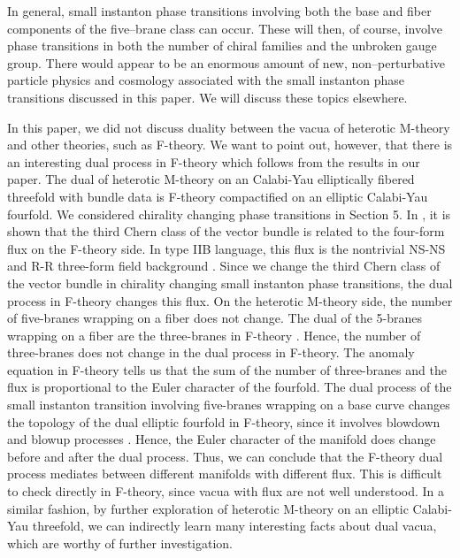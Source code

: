 \documentclass[a4paper,12pt]{article}
\numberwithin{equation}{section}
\theoremstyle{plain}
\begin{document}
In general, small instanton phase transitions involving both the base and
fiber components of the five--brane class can occur. These will then, of
course, involve phase transitions in both the number of chiral families and
the unbroken gauge group. There would appear to be an enormous amount of new,
non--perturbative particle physics and cosmology associated with the small
instanton phase transitions discussed in this paper. We will discuss these
topics elsewhere. 

In this paper, we did not discuss duality between the vacua of heterotic
M-theory and other theories, such as F-theory. We want to point out, however,
that there is an interesting dual 
process in F-theory which follows from the results in our paper. The dual of 
heterotic M-theory on an Calabi-Yau 
elliptically fibered threefold with bundle data is F-theory
compactified on an elliptic Calabi-Yau fourfold.  
We considered chirality changing phase transitions in Section 5. 
In \cite{AnCu}, it is shown that the third Chern class of the vector bundle 
is related to the four-form flux on the F-theory side. 
In type IIB language, 
this flux is the nontrivial NS-NS and R-R three-form field 
background \cite{GVW, DRS}. Since we change the third Chern class of the vector
bundle in chirality changing small instanton phase transitions, 
the dual process in F-theory changes this flux. On the 
heterotic M-theory side, the 
number of five-branes wrapping on a fiber does not change. The dual of the 
5-branes wrapping on a fiber are the three-branes in F-theory \cite{SVW}. 
Hence, the number of three-branes does not change 
in the dual process in F-theory. The anomaly equation in F-theory tells us 
that the sum of the number of three-branes and the flux is proportional to 
the Euler character of the fourfold. The dual process of the small instanton 
transition involving five-branes wrapping on a base curve changes the topology 
of the dual elliptic fourfold in F-theory, since it involves blowdown and 
blowup processes \cite{MoVa, DiRa, Wi3}. Hence, the Euler character of the manifold 
does change before and after the dual process. Thus, we can conclude that 
the F-theory dual process mediates between 
different manifolds with different flux. 
This is difficult to check directly in F-theory, since vacua with 
flux are not well understood. In a similar fashion, 
by further exploration of heterotic M-theory on an elliptic 
Calabi-Yau threefold, 
we can indirectly learn many interesting facts about dual vacua, which are 
worthy of further investigation.  
 
\end{document}
